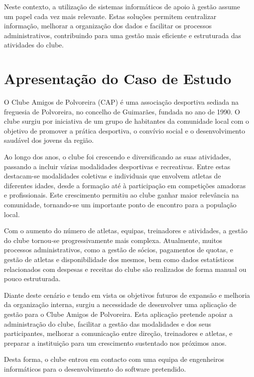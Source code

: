 \documentclass[a4paper,12pt]{scrreprt}
\begin{document}
Neste contexto, a utilização de sistemas informáticos de apoio à gestão assume um papel cada vez mais relevante. Estas soluções permitem centralizar informação, melhorar a organização dos dados e facilitar os processos administrativos, contribuindo para uma gestão mais eficiente e estruturada das atividades do clube.
\section{Apresentação do Caso de Estudo}
O Clube Amigos de Polvoreira (CAP) é uma associação desportiva sediada na freguesia de Polvoreira, no concelho de Guimarães, fundada no ano de 1990. O clube surgiu por iniciativa de um grupo de habitantes da comunidade local com o objetivo de promover a prática desportiva, o convívio social e o desenvolvimento saudável dos jovens da região.

Ao longo dos anos, o clube foi crescendo e diversificando as suas atividades, passando a incluir várias modalidades desportivas e recreativas. Entre estas destacam-se modalidades coletivas e individuais que envolvem atletas de diferentes idades, desde a formação até à participação em competições amadoras e profissionais. Este crescimento permitiu ao clube ganhar maior relevância na comunidade, tornando-se um importante ponto de encontro para a população local.

Com o aumento do número de atletas, equipas, treinadores e atividades, a gestão do clube tornou-se progressivamente mais complexa. Atualmente, muitos processos administrativos, como a gestão de sócios, pagamentos de quotas, e gestão de atletas e disponibilidade dos mesmos, bem como dados estatísticos relacionados com despesas e receitas do clube são realizados de forma manual ou pouco estruturada.

Diante deste cenário e tendo em vista os objetivos futuros de expansão e melhoria da organização interna, surgiu a necessidade de desenvolver uma aplicação de gestão para o Clube Amigos de Polvoreira. Esta aplicação pretende apoiar a administração do clube, facilitar a gestão das modalidades e dos seus participantes, melhorar a comunicação entre direção, treinadores e atletas, e preparar a instituição para um crescimento sustentado nos próximos anos.

Desta forma, o clube entrou em contacto com uma equipa de engenheiros informáticos para o desenvolvimento do software pretendido.
\end{document}

